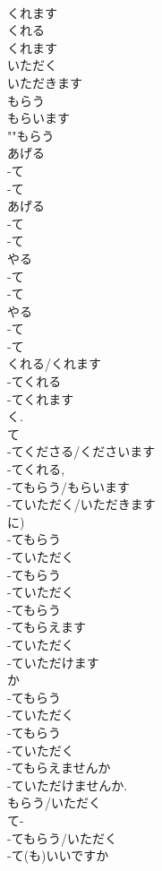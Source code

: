 \documentclass[8pt]{extreport}
\begin{document}
\begin{CJK}{UTF8}{min}
\\	くれます
\\	くれる
\\	くれます
\\	いただく
\\	いただきます
\\	もらう
\\	もらいます
\\	""もらう
\\	あげる 
\\	-て 
\\	-て 
\\	あげる	
\\	-て 
\\	-て 
\\	やる	
\\	-て 
\\	-て 
\\	やる	
\\	-て 
\\	-て 
\\	くれる/くれます	
\\	-てくれる
\\	-てくれます 
\\	く. 
\\	て 
\\	-てくださる/くださいます	
\\	-てくれる, 
\\	-てもらう/もらいます
\\	-ていただく/いただきます
\\	に)
\\	-てもらう 
\\	-ていただく	
\\	-てもらう 
\\	-ていただく	
\\	-てもらう 
\\	-てもらえます 
\\	-ていただく 
\\	-ていただけます
\\	か 
\\	-てもらう 
\\	-ていただく 
\\	-てもらう 
\\	-ていただく 
\\	-てもらえませんか
\\	-ていただけませんか.
\\	もらう/いただく 
\\	て-
\\	-てもらう/いただく 
\\	-て(も)いいですか	

\end{CJK}
\end{document}
